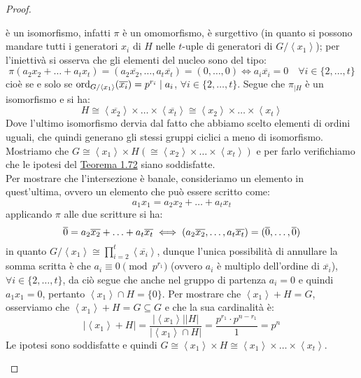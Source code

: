 \documentclass[11pt]{scrartcl}
\begin{document}
\begin{proof}
\begin{itemize}
\[                    \]
            è un isomorfismo, infatti $\pi$ è un omomorfismo, è surgettivo (in quanto si possono mandare tutti i generatori $x_i$ di $H$ nelle $t$-uple di generatori di $G/\left<x_1\right>$); per l'iniettivà si osserva che gli elementi del nucleo sono del tipo:
                \[ \pi(a_2x_2 + \ldots + a_tx_t) = (a_2\overline{x_2}, \ldots, a_t\overline{x_t}) = (0,\ldots,0) \iff a_i\overline{x_i} = 0 \quad \forall i \in\{2,\ldots,t\}
                    \]
            cioè se e solo se $\operatorname{ord}_{G/\left<x_1\right>}(\overline{x_i}) = p^{r_i} \mid a_i$, $\forall i \in \{2,\ldots,t\}$. Segue che $\pi_{\mid H}$ è un isomorfismo e si ha:
                \[ H \cong \left<\overline{x_2}\right> \times \ldots \times \left<\overline{x_t}\right> \cong \left<{x_2}\right> \times \ldots \times \left<{x_t}\right>
                    \]
            Dove l'ultimo isomorfismo dervia dal fatto che abbiamo scelto elementi di ordini uguali, che quindi generano gli stessi gruppi ciclici a meno di isomorfismo.
            Mostriamo che $G \cong \left<x_1\right> \times H (\cong \left<x_2\right> \times \ldots \times \left<x_t\right>)$ e per farlo verifichiamo che le ipotesi del \hyperref[t:1.72]{Teorema 1.72} siano soddisfatte. \\
            Per mostrare che l'intersezione è banale, consideriamo un elemento in quest'ultima, ovvero un elemento che può essere scritto come:
                \[ a_1x_1 = a_2x_2 + \ldots + a_tx_t
                    \]
            applicando $\pi$ alle due scritture si ha:
                \[ \overline 0 =  a_2\overline{x_2} + \ldots + a_t\overline{x_t} \iff (a_2\overline{x_2}, \ldots, a_t\overline{x_t}) = (\overline 0,\ldots, \overline 0)
                    \]
            in quanto $G/\left<x_1\right> \cong \prod_{i= 2}^{t}\left<\overline{x_i}\right>$, dunque l'unica possibilità di annullare la somma scritta è che $a_i \equiv 0 \pmod{p^{r_1}}$ (ovvero $a_i$ è multiplo dell'ordine di $\overline{x_i}$), $\forall i \in \{2,\ldots,t\}$, da ciò segue che
            anche nel gruppo di partenza $a_i = 0$ e quindi $a_1x_1 = 0$, pertanto $\left<x_1\right> \cap H = \{0\}$.
            Per mostrare che $\left<x_1\right> + H = G$, osserviamo che $\left<x_1\right> + H = G \subseteq G$ e che la sua cardinalità è:
                \[ |\left<x_1\right> + H| = \frac{|\left<x_1\right>||H|}{|\left<x_1\right> \cap H|} = \frac{p^{r_1}\cdot p^{n - r_1}}{1} = p^n
                    \]
            Le ipotesi sono soddisfatte e quindi $G \cong \left<x_1\right> \times H \cong \left<x_1\right> \times \ldots \times \left<x_t\right>$.

\end{itemize}
\end{proof}
\end{document}
